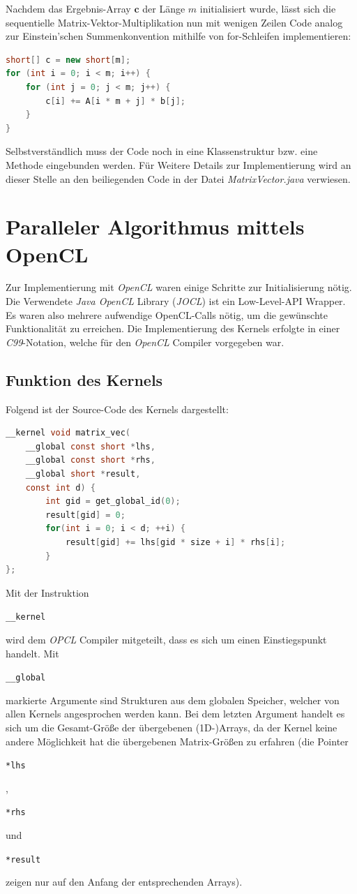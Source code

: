 \documentclass[
	ngerman,
	ruledheaders=section,
	class=report,
	thesis={type=Dokumentation},
	ignore-missing-data=true,
	accentcolor=9c,
	custommargins=false,
	marginpar=false,
	parskip=half-,
	fontsize=11pt,
]{tudapub}
\let\code\texttt
\def\code#1{\begin{small}\texttt{#1}\end{small}}
\begin{document}
Nachdem das Ergebnis-Array $\mathbf{c}$ der Länge $m$ initialisiert wurde, lässt sich die sequentielle Matrix-Vektor-Multiplikation nun mit wenigen Zeilen Code analog zur Einstein'schen Summenkonvention mithilfe von for-Schleifen implementieren:
\begin{lstlisting}[language=java]
short[] c = new short[m];
for (int i = 0; i < m; i++) {
	for (int j = 0; j < m; j++) {
		c[i] += A[i * m + j] * b[j];
	}
}
\end{lstlisting}
Selbstverständlich muss der Code noch in eine Klassenstruktur bzw. eine Methode eingebunden werden. Für Weitere Details zur Implementierung wird an dieser Stelle an den beiliegenden Code in der Datei \textit{MatrixVector.java} verwiesen.

\chapter{Paralleler Algorithmus mittels OpenCL}

Zur Implementierung mit \textit{OpenCL }waren einige Schritte zur Initialisierung nötig. Die Verwendete \textit{Java OpenCL} Library (\textit{JOCL}) ist ein Low-Level-API Wrapper. Es waren also mehrere aufwendige OpenCL-Calls nötig, um die gewünschte Funktionalität zu erreichen. Die Implementierung des Kernels erfolgte in einer \textit{C99}-Notation, welche für den \textit{OpenCL} Compiler vorgegeben war.

\section*{Funktion des Kernels}
Folgend ist der Source-Code des Kernels dargestellt:
\begin{lstlisting}[language=c,label=kernel_source]
__kernel void matrix_vec(
	__global const short *lhs, 
	__global const short *rhs, 
	__global short *result, 
	const int d) {
		int gid = get_global_id(0);
		result[gid] = 0;		
		for(int i = 0; i < d; ++i) {
			result[gid] += lhs[gid * size + i] * rhs[i];
		}
};
\end{lstlisting}
Mit der Instruktion \code{\_\_kernel} wird dem \textit{OPCL} Compiler mitgeteilt, dass es sich um einen Einstiegspunkt handelt. Mit \code{\_\_global} markierte Argumente sind Strukturen aus dem globalen Speicher, welcher von allen Kernels angesprochen werden kann. Bei dem letzten Argument handelt es sich um die Gesamt-Größe der übergebenen (1D-)Arrays, da der Kernel keine andere Möglichkeit hat die übergebenen Matrix-Größen zu erfahren (die Pointer \code{*lhs}, \code{*rhs} und \code{*result} zeigen nur auf den Anfang der entsprechenden Arrays).
\end{document}
